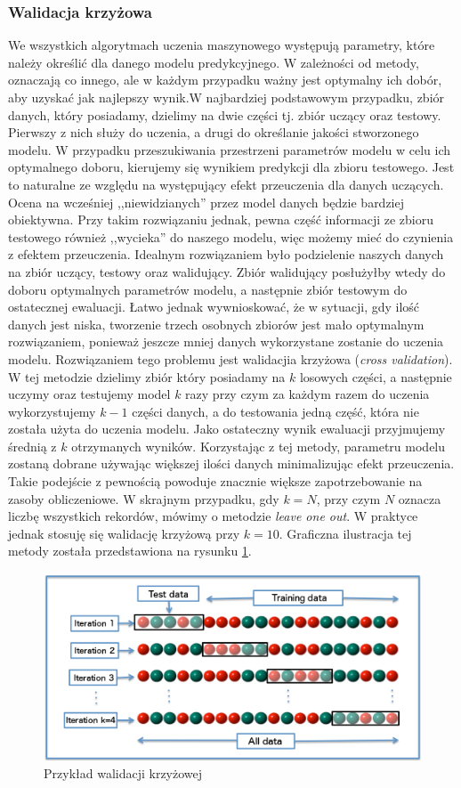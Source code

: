 \subsubsection{Walidacja krzyżowa}
We wszystkich algorytmach uczenia maszynowego występują parametry, które należy określić dla danego modelu predykcyjnego. W zależności od metody, oznaczają co innego, ale w każdym przypadku ważny jest optymalny ich dobór, aby uzyskać jak najlepszy wynik.W najbardziej podstawowym przypadku, zbiór danych, który posiadamy, dzielimy na dwie części tj. zbiór uczący oraz testowy. Pierwszy z nich służy do uczenia, a drugi do określanie jakości stworzonego modelu. W przypadku przeszukiwania przestrzeni parametrów modelu w celu ich optymalnego doboru, kierujemy się wynikiem predykcji dla zbioru testowego. Jest to naturalne ze względu na występujący efekt przeuczenia dla danych uczących. Ocena na wcześniej ,,niewidzianych'' przez model danych będzie bardziej obiektywna. Przy takim rozwiązaniu jednak, pewna część informacji ze zbioru testowego również ,,wycieka'' do naszego modelu, więc możemy mieć do czynienia z efektem przeuczenia. Idealnym rozwiązaniem było podzielenie naszych danych na zbiór uczący, testowy oraz walidujący. Zbiór walidujący posłużyłby wtedy do doboru optymalnych parametrów modelu, a następnie zbiór testowym do ostatecznej ewaluacji. Łatwo jednak wywnioskować, że w sytuacji, gdy ilość danych jest niska, tworzenie trzech osobnych zbiorów jest mało optymalnym rozwiązaniem, ponieważ jeszcze mniej danych wykorzystane zostanie do uczenia modelu. Rozwiązaniem tego problemu jest walidacjia krzyżowa (\textit{cross validation}). W tej metodzie dzielimy zbiór który posiadamy na $k$ losowych części, a następnie uczymy oraz testujemy model $k$ razy przy czym za każdym razem do uczenia wykorzystujemy $k-1$ części danych, a do testowania jedną część, która nie została użyta do uczenia modelu. Jako ostateczny wynik ewaluacji przyjmujemy średnią z $k$ otrzymanych wyników. Korzystając z tej metody, parametru modelu zostaną dobrane używając większej ilości danych minimalizując efekt przeuczenia. Takie podejście z pewnością powoduje znacznie większe zapotrzebowanie na zasoby obliczeniowe. W skrajnym przypadku, gdy $k=N$, przy czym $N$ oznacza liczbę wszystkich rekordów, mówimy o metodzie \textit{leave one out}. W praktyce jednak stosuję się walidację krzyżową przy $k=10$. Graficzna ilustracja tej metody została przedstawiona na rysunku \ref{cv}.
\begin{figure}[ht!]
\centering
\includegraphics[scale=0.7]{res/cv.jpg}
\caption[Caption for LOF]{Przykład walidacji krzyżowej\footnotemark} \label{cv} 
\end{figure}
